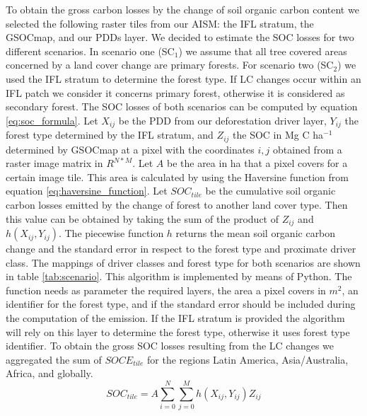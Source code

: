 		To obtain the gross carbon losses by the change of soil organic carbon content we selected the following raster tiles from our \ac{AISM}: the \ac{IFL} stratum, the \ac{GSOCmap}, and our \acp{PDD} layer. We decided to estimate the \ac{SOC} losses for two different scenarios. In scenario one (SC$_1$) we assume that all tree covered areas concerned by a land cover change are primary forests. For scenario two (SC$_2$) we used the \ac{IFL} stratum to determine the forest type. If \ac{LC} changes occur within an \ac{IFL} patch we consider it concerns primary forest, otherwise it is considered as secondary forest. The \ac{SOC} losses of both scenarios can be computed by equation \ref{eq:soc_formula}. Let $X_{ij}$ be the \ac{PDD} from our deforestation driver layer, $Y_{ij}$ the forest type determined by the \ac{IFL} stratum, and $Z_{ij}$ the \ac{SOC} in Mg C ha$^{-1}$ determined by \ac{GSOCmap} at a pixel with the coordinates $i,j$ obtained from a raster image matrix in $R^{N*M}$. Let $A$ be the area in ha that a pixel covers for a certain image tile. This area is calculated by using the Haversine function from equation \ref{eq:haversine_function}. Let $SOC_{tile}$ be the cumulative soil organic carbon losses emitted by the change of forest to another land cover type. Then this value can be obtained by taking the sum of the product of $Z_{ij}$ and $h(X_{ij}, Y_{ij})$. The piecewise function $h$ returns the mean soil organic carbon change and the standard error in respect to the forest type and proximate driver class. The mappings of driver classes and forest type for both scenarios are shown in table \ref{tab:scenario}. This algorithm is implemented by means of Python. The function needs as parameter the required layers, the area a pixel covers in $m^2$, an identifier for the forest type, and if the standard error should be included during the computation of the emission. If the \ac{IFL} stratum is provided the algorithm will rely on this layer to determine the forest type, otherwise it uses forest type identifier. To obtain the gross \ac{SOC} losses resulting from the \ac{LC} changes we aggregated the sum of $SOCE_{tile}$ for the regions Latin America, Asia/Australia, Africa, and globally. 
		\begin{equation}
		\label{eq:soc_formula}
			SOC_{tile} = A\displaystyle\sum_{i=0}^{N}\displaystyle\sum_{j=0}^{M} h(X_{ij}, Y_{ij})Z_{ij}
		\end{equation}
